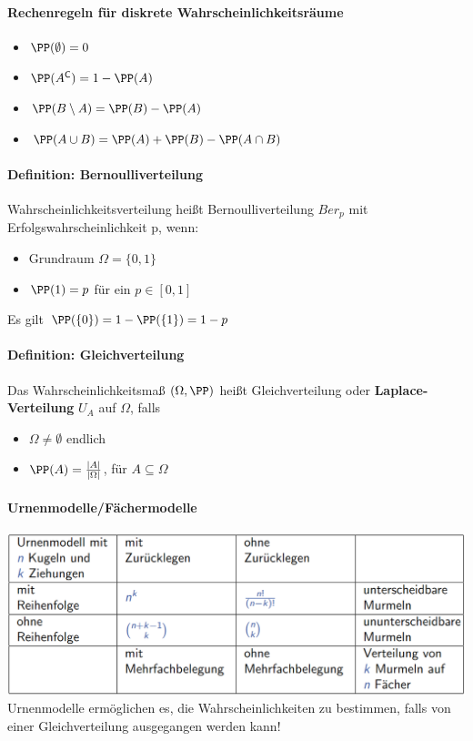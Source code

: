 \paragraph{Rechenregeln für diskrete Wahrscheinlichkeitsräume}\label{rules}
\begin{itemize}
	\item $\PP(\emptyset)=0$
	\item $\PP(A^{\mathsf{C}})=1-\PP(A)$
	\item $\PP(B\setminus A) = \PP(B)-\PP(A)$
	\item $\PP(A\cup B)=\PP(A)+\PP(B)-\PP(A\cap B)$
\end{itemize}

\paragraph{Definition: Bernoulliverteilung}
Wahrscheinlichkeitsverteilung heißt Bernoulliverteilung $Ber_p$ mit Erfolgswahrscheinlichkeit p, wenn:
\begin{itemize}
	\item Grundraum $\Omega={\{0,1\}}$
	\item $\PP(1)=p$ für ein $p\in[0,1]$
\end{itemize}
Es gilt $\PP(\{0\})=1-\PP(\{1\})=1-p$

\paragraph{Definition: Gleichverteilung}
Das Wahrscheinlichkeitsmaß $(\Omega,\PP)$ heißt Gleichverteilung oder \textbf{Laplace-Verteilung} $U_A$ auf $\Omega$, falls
\begin{itemize}
	\item $\Omega\neq\emptyset$ endlich
	\item $\PP(A)=\frac{|A|}{|\Omega|}$, für $A\subseteq\Omega$
\end{itemize}

\paragraph{Urnenmodelle/Fächermodelle}
\includegraphics[width=\textwidth]{images/image1.png}
Urnenmodelle ermöglichen es, die Wahrscheinlichkeiten zu bestimmen, falls von einer Gleichverteilung ausgegangen
werden kann!

